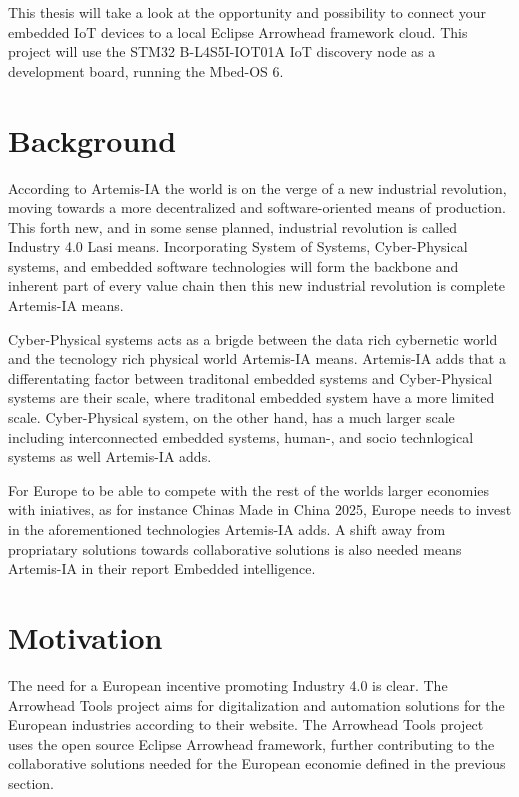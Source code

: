 This thesis will take a look at the opportunity and possibility to connect your embedded IoT devices to a local Eclipse Arrowhead framework cloud.
This project will use the STM32 B-L4S5I-IOT01A IoT discovery node as a development board, running the Mbed-OS 6. 
\section{Background}
According to Artemis-IA the world is on the verge of a new industrial revolution, moving towards a more decentralized and software-oriented means of production.\cite{Artemis2021}
This forth new, and in some sense planned, industrial revolution is called Industry 4.0 Lasi means.\cite{Lasi2014} 
Incorporating System of Systems, Cyber-Physical systems, and embedded software technologies will form the backbone and inherent part of every value chain then this new industrial revolution is complete Artemis-IA means.\cite{Artemis2021}

Cyber-Physical systems acts as a brigde between the data rich cybernetic world and the tecnology rich physical world Artemis-IA means.
Artemis-IA adds that a differentating factor between traditonal embedded systems and Cyber-Physical systems are their scale, where traditonal embedded system have a more limited scale.
Cyber-Physical system, on the other hand, has a much larger scale including interconnected embedded systems, human-, and socio technlogical systems as well Artemis-IA adds.\cite{Artemis2021}

For Europe to be able to compete with the rest of the worlds larger economies with iniatives, as for instance Chinas Made in China 2025, Europe needs to invest in the aforementioned technologies Artemis-IA adds.
A shift away from propriatary solutions towards collaborative solutions is also needed means Artemis-IA in their report Embedded intelligence.\cite{Artemis2021} 
\section{Motivation}
The need for a European incentive promoting Industry 4.0 is clear. 
The Arrowhead Tools project aims for digitalization and automation solutions for the European industries according to their website.\cite{AT2021}
The Arrowhead Tools project uses the open source Eclipse Arrowhead framework, further contributing to the collaborative solutions needed for the European economie defined in the previous section.

